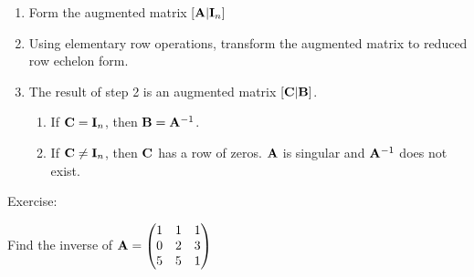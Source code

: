 \documentclass[]{book}
\theoremstyle{definition}
\theoremstyle{definition}
\theoremstyle{definition}
\theoremstyle{remark}
\begin{document}
\begin{enumerate} 
\item Form the augmented matrix $[ {\bf A} | {\bf I}_n]$
\item Using elementary row operations, transform the augmented matrix to reduced row echelon form.
\item The result of step 2 is an augmented matrix $[ {\bf C} | {\bf B} ]$.
            \begin{enumerate}
                \item  If ${\bf C}={\bf I}_n$, then ${\bf B}={\bf A}^{-1}$.
                \item  If ${\bf C}\ne{\bf I}_n$, then $\bf C$ has a row of zeros.
                ${\bf A}$ is singular and ${\bf A}^{-1}$ does not exist.
            \end{enumerate}
\end{enumerate}

Exercise:

Find the inverse of
\({\bf A}=\begin{pmatrix} 1&1&1\\0&2&3\\5&5&1 \end{pmatrix}\)




\end{document}
